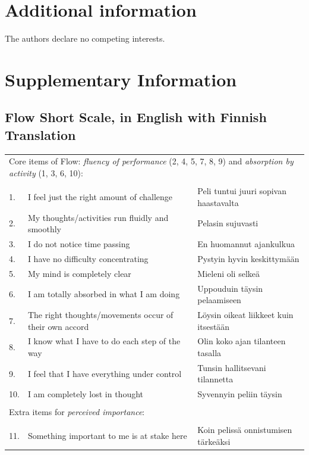 \documentclass[fleqn,10pt]{wlscirep}
\begin{document}
\section*{Additional information}

The authors declare no competing interests.

\section*{Supplementary Information}
\subsection*{Flow Short Scale, in English with Finnish Translation}

\begin{minipage}{\textwidth}
\begin{tabular}{l p{} p{}}
\multicolumn{3}{l}{Core items of Flow: {\it fluency of performance} (2, 4, 5, 7, 8, 9) and {\it absorption by activity} (1, 3, 6, 10):} \\
\\
1. & I feel just the right amount of challenge    &    Peli tuntui juuri sopivan haastavalta  \\
2. & My thoughts/activities run fluidly and smoothly   & Pelasin sujuvasti \\
3. & I do not notice time passing  & En huomannut ajankulkua \\
4. & I have no difficulty concentrating & Pystyin hyvin keskittym\"{a}\"{a}n \\
5. & My mind is completely clear & Mieleni oli selke\"{a} \\
6. & I am totally absorbed in what I am doing & Uppouduin t\"{a}ysin pelaamiseen \\
7. & The right thoughts/movements occur of their own accord & L\"{o}ysin oikeat liikkeet kuin itsest\"{a}\"{a}n \\
8. & I know what I have to do each step of the way & Olin koko ajan tilanteen tasalla \\
9. & I feel that I have everything under control & Tunsin hallitsevani tilannetta \\
10. & I am completely lost in thought & Syvennyin peliin t\"{a}ysin  \\
\\
\multicolumn{3}{l}{Extra items for {\it perceived importance}:} \\
\\
11. & Something important to me is at stake here & Koin peliss\"{a} onnistumisen t\"{a}rke\"{a}ksi \\

\end{tabular}
\end{minipage}
\end{document}
